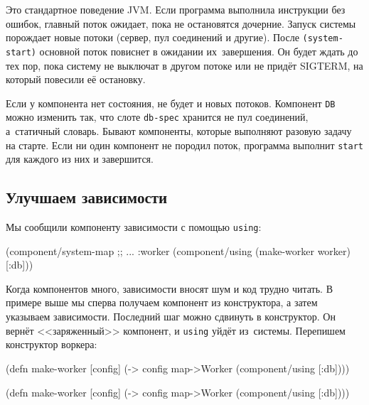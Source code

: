 
Это стандартное поведение JVM. Если программа выполнила инструкции без ошибок,
главный поток ожидает, пока не остановятся дочерние. Запуск системы порождает
новые потоки (сервер, пул соединений и другие). После \verb|(system-start)|
основной поток повиснет в ожидании их~завершения. Он будет ждать до тех пор,
пока систему не выключат в другом потоке или не придёт SIGTERM, на который
повесили её остановку.

Если у компонента нет состояния, не будет и новых потоков. Компонент \verb|DB|
можно изменить так, что слоте \verb|db-spec| хранится не пул соединений,
а~статичный словарь. Бывают компоненты, которые выполняют разовую задачу на
старте. Если ни один компонент не породил поток, программа выполнит \verb|start|
для каждого из них и завершится.

\subsection{Улучшаем зависимости}


Мы сообщили компоненту зависимости с помощью \verb|using|:

\begin{english}
  \begin{clojure}
(component/system-map
 ;; ...
 :worker (component/using
          (make-worker worker) [:db]))
  \end{clojure}
\end{english}

Когда компонентов много, зависимости вносят шум и код трудно читать. В примере
выше мы сперва получаем компонент из конструктора, а затем указываем
зависимости. Последний шаг можно сдвинуть в конструктор. Он вернёт
<<заряженный>> компонент, и \verb|using| уйдёт из~системы. Перепишем конструктор
воркера:

\ifx\DEVICETYPE\MOBILE

\begin{english}
  \begin{clojure}
(defn make-worker [config]
  (-> config
      map->Worker
      (component/using [:db])))
  \end{clojure}
\end{english}

\else

\begin{english}
  \begin{clojure}
(defn make-worker [config]
  (-> config map->Worker (component/using [:db])))
  \end{clojure}
\end{english}

